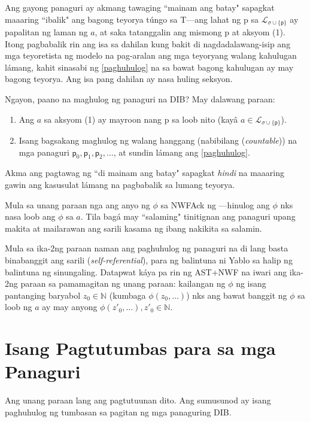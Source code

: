 \documentclass{article}
\begin{document}
Ang gayong panaguri ay akmang tawaging ``mainam ang batay" sapagkat maaaring ``ibalik" ang bagong teyorya túngo sa \textsf{T}---ang lahat ng \textsf{p} sa $\mathcal{L}_{\sigma \cup \{\textsf{p}\}}$ ay papalitan ng laman ng $a$, at saka tatanggalin ang mismong \textsf{p} at aksyom (1). Itong pagbabalik rin ang isa sa dahilan kung bakit di nagdadalawang-isip ang mga teyoretista ng modelo na pag-aralan ang mga teyoryang walang kahulugan lámang, kahit sinasabi ng \ref{paghuhulog} na sa bawat bagong kahulugan ay may bagong teyorya. Ang isa pang dahilan ay nasa huling seksyon.

Ngayon, paano na maghulog ng panaguri na DIB? May dalawang paraan:

\begin{enumerate}
\item Ang $a$ sa aksyom (1) ay mayroon nang \textsf{p} sa loob nito (kayâ $a \in \mathcal{L}_{\sigma \cup \{\textsf{p}\}}$).
\item Isang bagsakang maghulog ng walang hanggang (nabibilang (\textit{countable})) na mga panaguri $\textsf{p}_{0}, \textsf{p}_{1}, \textsf{p}_{2}, \ldots$, at sundin lámang ang \ref{paghuhulog}.
\end{enumerate}

\noindent Akma ang pagtawag ng ``di mainam ang batay" sapagkat \textit{hindi} na maaaring gawin ang kasusulat lámang na pagbabalik sa lumang teyorya.

Mula sa unang paraan nga ang anyo ng $\phi$ sa \textsf{NWFAck} ng \cite{ast-nwf}---hinulog ang $\phi$ nks nasa loob ang $\phi$ sa $a$. Tila bagá may ``salaming" tinitignan ang panaguri upang makita at mailarawan ang sarili kasama ng ibang nakikita sa salamin.

Mula sa ika-2ng paraan naman ang paghuhulog ng panaguri na di lang basta binabanggit ang sarili (\textit{self-referential}), para ng balintuna ni Yablo\cite{yablo} sa halip ng balintuna ng sinungaling. Datapwat káya pa rin ng \textsf{AST+NWF} na iwari ang ika-2ng paraan sa pamamagitan ng unang paraan: kailangan ng $\phi$ ng isang pantanging baryabol $z_0\in\mathbb{N}$ (kumbaga $\phi(z_0, \ldots)$) nks ang bawat banggit ng $\phi$ sa loob ng $a$ ay may anyong $\phi(z'_0, \ldots), z'_0 \in\mathbb{N}$.

\section{Isang Pagtutumbas para sa mga Panaguri}

Ang unang paraan lang ang pagtutuunan dito. Ang sumusunod ay isang paghuhulog ng tumbasan sa pagitan ng mga panaguring DIB.
\end{document}
